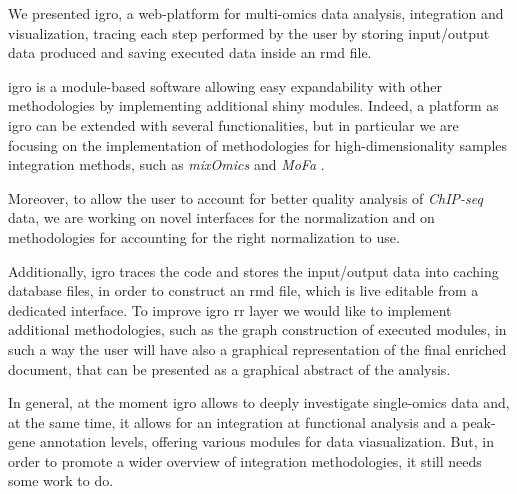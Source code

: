 We presented \gls{igro}, a web-platform for multi-omics data analysis, integration and visualization, tracing each step performed by the user by storing input/output data produced and saving executed data inside an \gls{rmd} file.

\gls{igro} is a module-based software allowing easy expandability with other methodologies by implementing additional shiny modules.
Indeed, a platform as \gls{igro} can be extended with several functionalities, but in particular we are focusing on the implementation of methodologies for high-dimensionality samples integration methods, such as \textit{mixOmics} \cite{Rohart2017} and \textit{MoFa} \cite{Argelaguet2018}.

Moreover, to allow the user to account for better quality analysis of \textit{ChIP-seq} data, we are working on novel interfaces for the normalization and on methodologies for accounting for the right normalization to use.

Additionally, \gls{igro} traces the code and stores the input/output data into caching database files, in order to construct an \gls{rmd} file, which is live editable from a dedicated interface.
To improve \gls{igro} \gls{rr} layer we would like to implement additional methodologies, such as the graph construction of executed modules, in such a way the user will have also a graphical representation of the final enriched document, that can be presented as a graphical abstract of the analysis.

In general, at the moment \gls{igro} allows to deeply investigate single-omics data and, at the same time, it allows for an integration at functional analysis and a peak-gene annotation levels, offering various modules for data viasualization.
But, in order to promote a wider overview of integration methodologies, it still needs some work to do.
